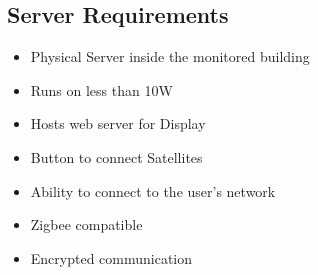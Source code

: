 \subsection{Server Requirements}
\begin{itemize}
 \item Physical Server inside the monitored building
 \item Runs on less than 10\ac{W}
 \item Hosts web server for Display
 \item Button to connect Satellites
 \item Ability to connect to the user's network
 \item Zigbee compatible
 \item Encrypted communication
\end{itemize}

